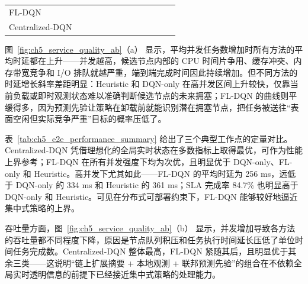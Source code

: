 \begin{table}[t]
{\begin{tabular}{l|cccc|cccc|cccc}
            FL-DQN
             & \cellcolor{secondcolor}{134}
             & \cellcolor{secondcolor}{59}
             & \cellcolor{secondcolor}{97.3}
             & \cellcolor{secondcolor}{211}
             & \cellcolor{secondcolor}{188}
             & \cellcolor{secondcolor}{52}
             & \cellcolor{secondcolor}{93.1}
             & \cellcolor{secondcolor}{284}
             & \cellcolor{secondcolor}{256}
             & \cellcolor{secondcolor}{43}
             & \cellcolor{secondcolor}{84.7}
             & \cellcolor{secondcolor}{401}                                                               \\

            Centralized-DQN
             & \cellcolor{bestcolor}{130}
             & \cellcolor{bestcolor}{61}
             & \cellcolor{bestcolor}{97.7}
             & \cellcolor{bestcolor}{202}
             & \cellcolor{bestcolor}{181}
             & \cellcolor{bestcolor}{54}
             & \cellcolor{bestcolor}{94.0}
             & \cellcolor{bestcolor}{273}
             & \cellcolor{bestcolor}{247}
             & \cellcolor{bestcolor}{46}
             & \cellcolor{bestcolor}{86.5}
             & \cellcolor{bestcolor}{387}                                                                 \\
            \bottomrule
        \end{tabular}}
\end{table}

图~\ref{fig:ch5_service_quality_ab}（a） 显示，平均并发任务数增加时所有方法的平均时延都在上升——并发越高，候选节点内部的 CPU 时间片争用、缓存冲突、内存带宽竞争和 I/O 排队就越严重，端到端完成时间因此持续增加。但不同方法的时延增长斜率差距明显：Heuristic 和 DQN-only 在高并发区间上升较快，仅靠当前负载或即时观测状态难以准确判断候选节点的未来拥塞；FL-DQN 的曲线则平缓得多，因为预测先验让策略在卸载前就能识别潜在拥塞节点，把任务被送往“表面空闲但实际竞争严重”目标的概率压低了。

表~\ref{tab:ch5_e2e_performance_summary} 给出了三个典型工作点的定量对比。Centralized-DQN 凭借理想化的全局实时状态在多数指标上取得最优，可作为性能上界参考；FL-DQN 在所有并发强度下均为次优，且明显优于 DQN-only、FL-only 和 Heuristic。高并发下尤其如此——FL-DQN 的平均时延为 256 ms，远低于 DQN-only 的 334 ms 和 Heuristic 的 361 ms；SLA 完成率 84.7\% 也明显高于 DQN-only 和 Heuristic。可见在分布式可部署约束下，FL-DQN 能够较好地逼近集中式策略的上界。

吞吐量方面，图~\ref{fig:ch5_service_quality_ab}（b） 显示，并发增加导致各方法的吞吐量都不同程度下降，原因是节点队列积压和任务执行时间延长压低了单位时间任务完成数。Centralized-DQN 整体最高，FL-DQN 紧随其后，且明显优于其余三类——这说明“链上扩展摘要 + 本地观测 + 联邦预测先验”的组合在不依赖全局实时透明信息的前提下已经接近集中式策略的处理能力。

